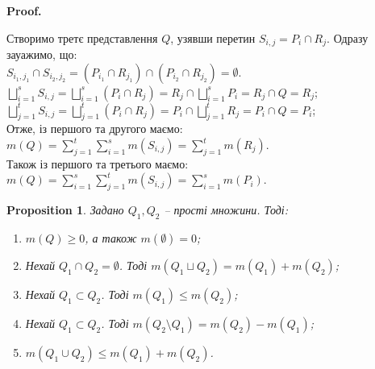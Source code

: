 \documentclass[a4paper, 10pt]{article}
\makeatletter
\def\huge{\displaystyle}
\def\qed{$\blacksquare$}
\theoremstyle{theoremdd}
\theoremstyle{theoremdd}
\theoremstyle{theoremdd}
\theoremstyle{theoremdd}
\theoremstyle{theoremdd}
\theoremstyle{theoremdd}
\theoremstyle{theoremdd}
\theoremstyle{theoremdd}
\theoremstyle{theoremdd}
\newtheorem{proposition}[theorem]{Proposition}
\theoremstyle{theoremdd}
\theoremstyle{theoremdd}
\theoremstyle{theoremdd}
\theoremstyle{theoremdd}
\theoremstyle{theoremdd}
\theoremstyle{theoremdd}
\renewenvironment{proof}[1][Proof.\\]{\par
\pushQED{\hfill \qed}%
\normalfont \topsep6\p@\@plus6\p@\relax
\trivlist
\item\relax
{\bfseries
#1\@addpunct{.}}\hspace\labelsep\ignorespaces
}{%
\popQED\endtrivlist\@endpefalse
}
\makeatother
\begin{document}
\begin{proof}
Створимо третє представлення $Q$, узявши перетин $S_{i,j} = P_i \cap R_j$. Одразу зауажимо, що:\\
$S_{i_1,j_1} \cap S_{i_2,j_2} = (P_{i_1} \cap R_{j_1}) \cap (P_{i_2} \cap R_{j_2}) = \emptyset$.\\
$\huge\bigsqcup_{i=1}^s S_{i,j} = \bigsqcup_{i=1}^s (P_i \cap R_j) = R_j \cap \bigsqcup_{i=1}^s P_i = R_j \cap Q = R_j$;\\
$\huge\bigsqcup_{j=1}^t S_{i,j} = \bigsqcup_{j=1}^t (P_i \cap R_j) = P_i \cap \bigsqcup_{j=1}^t R_j = P_i \cap Q = P_i$;\\
Отже, із першого та другого маємо: $m (Q) = \huge\sum_{j=1}^t \sum_{i=1}^s m(S_{i,j}) = \sum_{j=1}^t m(R_j)$.\\
Також із першого та третього маємо: $m(Q) = \huge\sum_{i=1}^s \sum_{j=1}^t m(S_{i,j}) = \sum_{i=1}^s m(P_i)$.
\end{proof}

\begin{proposition}
Задано $Q_1,Q_2$ -- прості множини. Тоді:
\begin{enumerate}[nosep,wide=0pt,label={\arabic*)}]
\item $m(Q) \geq 0$, а також $m(\emptyset) = 0$;
\item Нехай $Q_1 \cap Q_2 = \emptyset$. Тоді $m(Q_1 \sqcup Q_2) = m(Q_1) + m(Q_2)$;
\item Нехай $Q_1 \subset Q_2$. Тоді $m(Q_1) \leq m(Q_2)$;
\item Нехай $Q_1 \subset Q_2$. Тоді $m(Q_2 \setminus Q_1) = m(Q_2) - m(Q_1)$;
\item $m(Q_1 \cup Q_2) \leq m(Q_1) + m(Q_2)$.
\end{enumerate}
\end{proposition}
\end{document}
